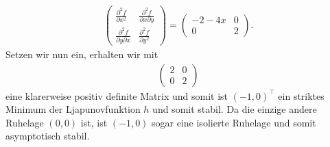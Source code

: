 \begin{solution}
\begin{itemize}
\begin{align*}
\begin{pmatrix}
        \frac{\partial^2 f }{\partial x^2} & \frac{\partial^2 f }{\partial x \partial y} \\
        \frac{\partial^2 f }{\partial y \partial x} & \frac{\partial^2 f }{\partial y^2}
      \end{pmatrix}
      =
      \begin{pmatrix}
        -2-4x & 0 \\
        0 & 2
      \end{pmatrix}.
    \end{align*}
    Setzen wir nun ein, erhalten wir mit
    \begin{align*}
    \begin{pmatrix}
      2 & 0 \\
      0 & 2
    \end{pmatrix}
    \end{align*}
    eine klarerweise positiv definite Matrix und somit ist $(-1,0)^{\top}$
    ein striktes Minimum der Ljapunovfunktion $h$ und somit stabil.
    Da die einzige andere Ruhelage $(0,0)$ ist, ist $(-1,0)$ sogar eine
    isolierte Ruhelage und somit asymptotisch stabil.
  \end{itemize}
\end{solution}
